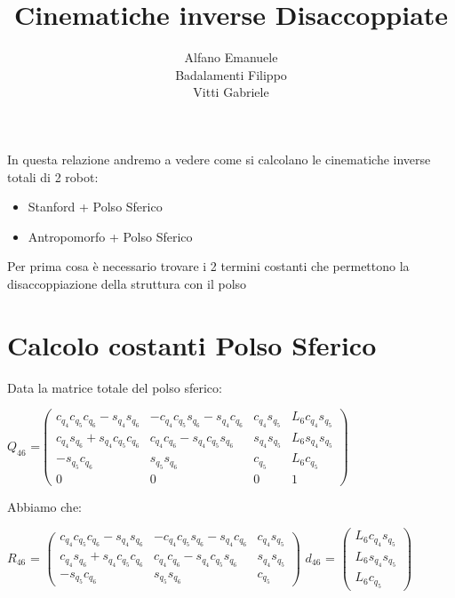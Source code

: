 \documentclass[a4paper,12pt]{article}
\author{Alfano Emanuele \\ Badalamenti Filippo \\ Vitti Gabriele}
\begin{document}
\title{Cinematiche inverse Disaccoppiate}
\maketitle

In questa relazione andremo a vedere come si calcolano le cinematiche
  inverse totali di 2 robot:

\begin{itemize}
\item Stanford + Polso Sferico
\item Antropomorfo + Polso Sferico
\end{itemize}

Per prima cosa è necessario trovare i 2 termini costanti che permettono la
disaccoppiazione della struttura con il polso
\pagebreak

\section{Calcolo costanti Polso Sferico}
Data la matrice totale del polso sferico:

\begin{center}
$Q_{46}$ =$\begin{pmatrix}
{c_{{q_4}}} {c_{{q_5}}} {c_{{q_6}}}-{s_{{q_4}}} {s_{{q_6}}} & -{c_{{q_4}}} {c_{{q_5}}} {s_{{q_6}}}-{s_{{q_4}}} {c_{{q_6}}} & {c_{{q_4}}} {s_{{q_5}}} & {L_6} {c_{{q_4}}} {s_{{q_5}}}\\
{c_{{q_4}}} {s_{{q_6}}}+{s_{{q_4}}} {c_{{q_5}}} {c_{{q_6}}} & {c_{{q_4}}} {c_{{q_6}}}-{s_{{q_4}}} {c_{{q_5}}} {s_{{q_6}}} & {s_{{q_4}}} {s_{{q_5}}} & {L_6} {s_{{q_4}}} {s_{{q_5}}}\\
-{s_{{q_5}}} {c_{{q_6}}} & {s_{{q_5}}} {s_{{q_6}}} & {c_{{q_5}}} & {L_6} {c_{{q_5}}}\\
0 & 0 & 0 & 1
\end{pmatrix}$
\end{center}
Abbiamo che:

\begin{center}
$R_{46}$ = $\begin{pmatrix}{c_{{q_4}}} {c_{{q_5}}} {c_{{q_6}}}-{s_{{q_4}}} {s_{{q_6}}} & -{c_{{q_4}}} {c_{{q_5}}} {s_{{q_6}}}-{s_{{q_4}}} {c_{{q_6}}} & {c_{{q_4}}} {s_{{q_5}}}\\
{c_{{q_4}}} {s_{{q_6}}}+{s_{{q_4}}} {c_{{q_5}}} {c_{{q_6}}} & {c_{{q_4}}} {c_{{q_6}}}-{s_{{q_4}}} {c_{{q_5}}} {s_{{q_6}}} & {s_{{q_4}}} {s_{{q_5}}}\\
-{s_{{q_5}}} {c_{{q_6}}} & {s_{{q_5}}} {s_{{q_6}}} & {c_{{q_5}}}\end{pmatrix}$
\space\space\space\space\space   
$d_{46}$ = $\begin{pmatrix}{L_6} {c_{{q_4}}} {s_{{q_5}}}\\
{L_6} {s_{{q_4}}} {s_{{q_5}}}\\
{L_6} {c_{{q_5}}}\end{pmatrix}$
\end{center}
\end{document}
